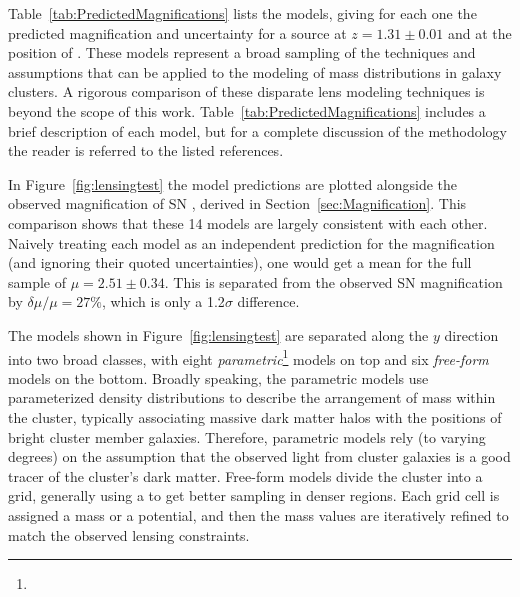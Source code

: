 Table~\ref{tab:PredictedMagnifications} lists the  models,
giving for each one the predicted magnification and uncertainty for a
source at $z=1.31\pm0.01$ and at the position of \tomas.  These models
represent a broad sampling of the techniques and assumptions that can
be applied to the modeling of mass distributions in galaxy clusters. A
rigorous comparison of these disparate lens modeling techniques is
beyond the scope of this work. Table~\ref{tab:PredictedMagnifications}
includes a brief description of each model, but for a complete
discussion of the methodology the reader is referred to the listed
references.

In Figure~\ref{fig:lensingtest} the model predictions are plotted
alongside the observed magnification of SN \tomas, derived in
Section~\ref{sec:Magnification}.  This comparison shows that these 14
models are largely consistent with each other. Naively treating each
model as an independent prediction for the magnification (and ignoring
their quoted uncertainties), one would get a mean for the full sample
of $\mu=2.51\pm0.34$.  This is separated from the observed SN
magnification by $\delta\mu/\mu=27\%$, which is only a 1.2$\sigma$
difference.

The models shown in Figure~\ref{fig:lensingtest} are separated along
the $y$ direction into two broad classes, with 
eight  {\it parametric}\footnote{}
models on top and six {\it free-form} models on the bottom.
Broadly speaking, the parametric models use parameterized density
distributions to describe the arrangement of mass within the cluster,
typically associating massive dark matter halos with the positions of
bright cluster member galaxies. Therefore, parametric models rely (to
varying degrees) on the assumption that the observed light from
cluster galaxies is a good tracer of the cluster's dark matter.
Free-form models divide the cluster into a grid, generally using a
 to get better sampling in denser regions. Each grid cell
is assigned a mass or a potential, and then the mass values are
iteratively refined to match the observed lensing
constraints. 

